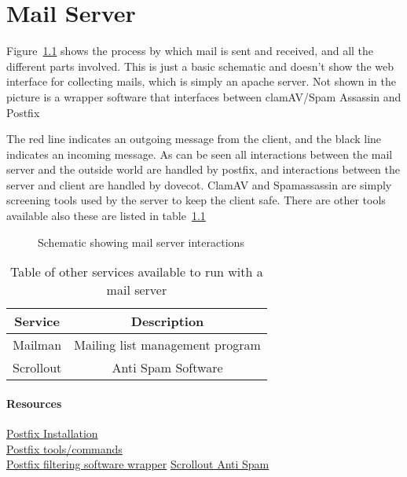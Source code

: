 \chapter{Mail Server}

Figure~\ref{fig:mail} shows the process by which mail is sent and received, and all the different parts involved.  This is just a basic schematic and doesn't show the web interface for collecting mails, which is simply an apache server.  Not shown in the picture is a wrapper software that interfaces between clamAV/Spam Assassin and Postfix

The red line indicates an outgoing message from the client, and the black line indicates an incoming message.  As can be seen all interactions between the mail server and the outside world are handled by postfix, and interactions between the server and client are handled by dovecot.  ClamAV and Spamassassin are simply screening tools used by the server to keep the client safe.  There are other tools available also these are listed in table~\ref{tab:mail_serv}

\vspace{1.5cm}
\begin{figure}[h!]
\centering

\caption{Schematic showing mail server interactions}
\label{fig:mail}
\end{figure}


\begin{table}[h!]
\centering
\begin{tabular}{cc}
\hline
Service & Description\\
\hline
Mailman & Mailing list management program\\
Scrollout & Anti Spam Software\\
\hline
\end{tabular}
\caption{Table of other services available to run with a mail server}
\label{tab:mail_serv}
\end{table}

\subsubsection*{Resources}

\href{http://www.serverubuntu.it/postfix-dovecot-guide}{Postfix Installation}\\
\href{http://www.serverubuntu.it/postfix-management-tools-commands}{Postfix tools/commands}\\
\href{https://help.ubuntu.com/community/PostfixAmavisNew}{Postfix filtering software wrapper}
\href{www.scrolloutf1.com}{Scrollout Anti Spam}\\
